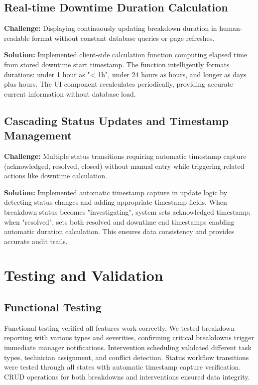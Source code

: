 \subsection{Real-time Downtime Duration Calculation}

\textbf{Challenge:} Displaying continuously updating breakdown duration in human-readable format without constant database queries or page refreshes.

\textbf{Solution:} Implemented client-side calculation function computing elapsed time from stored downtime start timestamp. The function intelligently formats durations: under 1 hour as "< 1h", under 24 hours as hours, and longer as days plus hours. The UI component recalculates periodically, providing accurate current information without database load.

\subsection{Cascading Status Updates and Timestamp Management}

\textbf{Challenge:} Multiple status transitions requiring automatic timestamp capture (acknowledged, resolved, closed) without manual entry while triggering related actions like downtime calculation.

\textbf{Solution:} Implemented automatic timestamp capture in update logic by detecting status changes and adding appropriate timestamp fields. When breakdown status becomes "investigating", system sets acknowledged timestamp; when "resolved", sets both resolved and downtime end timestamps enabling automatic duration calculation. This ensures data consistency and provides accurate audit trails.

\section{Testing and Validation}

\subsection{Functional Testing}

Functional testing verified all features work correctly. We tested breakdown reporting with various types and severities, confirming critical breakdowns trigger immediate manager notifications. Intervention scheduling validated different task types, technician assignment, and conflict detection. Status workflow transitions were tested through all states with automatic timestamp capture verification. CRUD operations for both breakdowns and interventions ensured data integrity.

